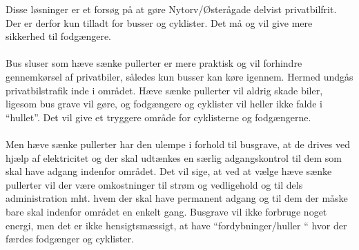 Disse løsninger er et forsøg på at gøre Nytorv/Østerågade delvist privatbilfrit. Der er derfor kun tilladt for busser og cyklister. Det må og vil give mere sikkerhed til fodgængere.
~\\\\
Bus sluser som hæve sænke pullerter er mere praktisk og vil forhindre gennemkørsel af privatbiler, således kun busser kan køre igennem. Hermed undgås privatbilstrafik inde i området. Hæve sænke pullerter vil aldrig skade biler, ligesom bus grave vil gøre, og fodgængere og cyklister vil heller ikke falde i “hullet”. Det vil give et tryggere område for cyklisterne og fodgængerne.
~\\\\
Men hæve sænke pullerter har den ulempe i forhold til busgrave, at de drives ved hjælp af elektricitet og der skal udtænkes en særlig adgangskontrol til dem som skal have adgang indenfor området. Det vil sige, at ved at vælge hæve sænke pullerter vil der være omkostninger til strøm og vedligehold og til dels administration mht. hvem der skal have permanent adgang og til dem der måske bare skal indenfor området en enkelt gang. Busgrave vil ikke forbruge noget energi, men det er ikke hensigtsmæssigt, at have “fordybninger/huller “ hvor der færdes fodgænger og cyklister.
